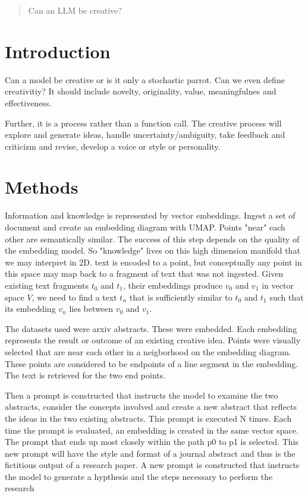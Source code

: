 \documentclass[twocolumn]{article}
\begin{document}
\begin{abstract}
Can an LLM be creative?
\end{abstract}

\section{Introduction}
Can a model be creative or is it only a stochastic parrot.   Can we even define creativitiy?   It should include novelty, originality, value, meaningfulnes and effectiveness.

Further, it is a process rather than a function call.  The creative process will explore and generate ideas, handle uncertainty/ambiguity, take feedback and criticizm and revise, develop
a voice or style or personality. 

\section{Methods}
Information and knowledge is represented by vector embeddings.  Ingest a set of document and create an embedding diagram with UMAP.   Points "near" each other are semantically similar.  The success of 
this step depends on the quality of the embedding model.   So "knowledge" lives on this high dimension manifold that we may interpret in 2D.  text is encoded to a point, but conceptually any point in this space 
may map back to a fragment of text that was not ingested.   Given existing text fragments \( t_0 \) and \( t_1 \), their embeddings produce \( v_0 \) and \( v_1 \) in vector space \( V \), we need to find 
a text \( t_n \) that is sufficiently similar to \( t_0 \) and \( t_1 \) such that its embedding \( v_n \) lies between \( v_0 \) and \( v_1 \).

The datasets used were arxiv abstracts.   These were embedded.   Each embedding represents the result or outcome of an existing creative idea.  Points were visually selected that are near each other
in a neigborhood on the embedding diagram.   These points are considered to be endpoints of a line segment in the embedding.   The text is retrieved for the two end points.

Then a prompt is constructed that instructs the model to examine the two abstracts, consider the concepts involved and create a new abstract that reflects the ideas in the two existing abstracts.   This 
prompt is executed N times.  Each time the prompt is evaluated, an embedding is created in the same vector space.   The prompt that ends up most closely within the path p0 to p1 is selected.   This new prompt will 
have the style and format of a journal abstract and thus is the fictitious output of a research paper.   A new prompt is constructed that instructs the model to generate a hypthesis and the steps necessary 
to perform the research
\end{document}
